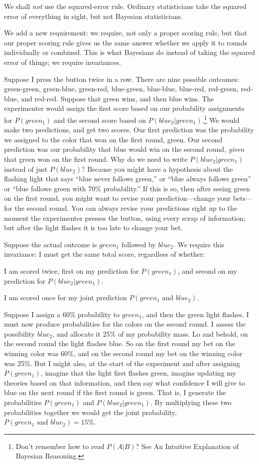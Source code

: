 {
 We shall \textit{not} use the squared-error rule. Ordinary
statisticians take the squared error of everything in sight, but not
Bayesian statisticians.}

{
 We add a new requirement: we require, not only a proper scoring
rule, but that our proper scoring rule gives us the same answer whether
we apply it to rounds individually or combined. This is what Bayesians
do instead of taking the squared error of things; we require
invariances.}

{
 Suppose I press the button twice in a row. There are nine possible
outcomes: green-green, green-blue, green-red, blue-green, blue-blue,
blue-red, red-green, red-blue, and red-red. Suppose that green wins,
and then blue wins. The experimenter would assign the first score based
on our probability assignments for $P(green_{1})$ and the
second score based on
$P(blue_{2}|green_{1})$.\footnote{Don't remember how to read $P(A|B)$? See
An Intuitive Explanation of Bayesian Reasoning.}
We would make two predictions, and get two scores. Our first prediction
was the probability we assigned to the color that won on the first
round, green. Our second prediction was our probability that blue would
win on the second round, \textit{given} that green won on the first
round. Why do we need to write
$P(blue_{2}|green_{1})$ instead of
just $P(blue_{2})$? Because you might have a hypothesis
about the flashing light that says ``blue never
follows green,'' or ``blue always
follows green'' or ``blue follows
green with 70\% probability.'' If this is so, then
after seeing green on the first round, you might want to revise your
prediction---change your bets---for the second round. You can always
revise your predictions right up to the moment the experimenter presses
the button, using every scrap of information; but after the light
flashes it is too late to change your bet.}

{
 Suppose the actual outcome is $green_{1}$ followed by
$blue_{2}$. We require this invariance: I must get the same
total score, regardless of whether:}

{
 I am scored twice, first on my prediction for
$P(green_{1})$, and second on my prediction for
$P(blue_{2}|green_{1})$.}

{
 I am scored once for my joint prediction $P(green_{1}
\text{ and } blue_{2})$.}

{
 Suppose I assign a 60\% probability to $green_{1}$, and
then the green light flashes. I must now produce probabilities for the
colors on the second round. I assess the possibility
$blue_{2}$, and allocate it 25\% of my probability mass. Lo
and behold, on the second round the light flashes blue. So on the first
round my bet on the winning color was 60\%, and on the second round my
bet on the winning color was 25\%. But I might also, at the start of
the experiment and after assigning $P(green_{1})$, imagine
that the light first flashes green, imagine updating my theories based
on that information, and then say what confidence I will give to blue
on the next round if the first round is green. That is, I generate the
probabilities $P(green_{1})$ and
$P(blue_{2}|green_{1})$. By
multiplying these two probabilities together we would get the joint
probability, $P(green_{1} \text{ and } blue_{2}) =
15\%$.}

